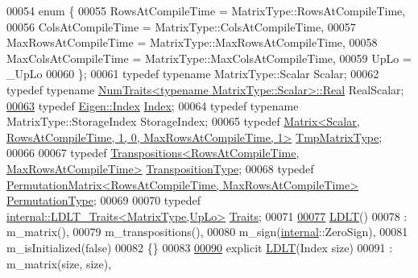 \begin{DoxyCode}
00054     \textcolor{keyword}{enum} \{
00055       RowsAtCompileTime = MatrixType::RowsAtCompileTime,
00056       ColsAtCompileTime = MatrixType::ColsAtCompileTime,
00057       MaxRowsAtCompileTime = MatrixType::MaxRowsAtCompileTime,
00058       MaxColsAtCompileTime = MatrixType::MaxColsAtCompileTime,
00059       UpLo = \_UpLo
00060     \};
00061     \textcolor{keyword}{typedef} \textcolor{keyword}{typename} MatrixType::Scalar Scalar;
00062     \textcolor{keyword}{typedef} \textcolor{keyword}{typename} \hyperlink{group___core___module_struct_eigen_1_1_num_traits}{NumTraits<typename MatrixType::Scalar>::Real}
       RealScalar;
\hyperlink{group___cholesky___module_ad9c57eb2fb3bbccd51b9d2e111bea355}{00063}     \textcolor{keyword}{typedef} \hyperlink{namespace_eigen_a62e77e0933482dafde8fe197d9a2cfde}{Eigen::Index} \hyperlink{group___cholesky___module_ad9c57eb2fb3bbccd51b9d2e111bea355}{Index}; 
00064     \textcolor{keyword}{typedef} \textcolor{keyword}{typename} MatrixType::StorageIndex StorageIndex;
00065     \textcolor{keyword}{typedef} \hyperlink{group___core___module}{Matrix<Scalar, RowsAtCompileTime, 1, 0, MaxRowsAtCompileTime, 1>}
       \hyperlink{group___core___module}{TmpMatrixType};
00066 
00067     \textcolor{keyword}{typedef} \hyperlink{group___core___module}{Transpositions<RowsAtCompileTime, MaxRowsAtCompileTime>}
       \hyperlink{group___core___module}{TranspositionType};
00068     \textcolor{keyword}{typedef} \hyperlink{group___core___module}{PermutationMatrix<RowsAtCompileTime, MaxRowsAtCompileTime>}
       \hyperlink{group___core___module}{PermutationType};
00069 
00070     \textcolor{keyword}{typedef} \hyperlink{struct_eigen_1_1internal_1_1_l_d_l_t___traits}{internal::LDLT\_Traits<MatrixType,UpLo>} 
      \hyperlink{struct_eigen_1_1internal_1_1_l_d_l_t___traits}{Traits};
00071 
\hyperlink{group___cholesky___module_a2e06dedd2651649c5b251fbf9ba4e7d4}{00077}     \hyperlink{group___cholesky___module_a2e06dedd2651649c5b251fbf9ba4e7d4}{LDLT}()
00078       : m\_matrix(),
00079         m\_transpositions(),
00080         m\_sign(\hyperlink{namespaceinternal}{internal}::ZeroSign),
00081         m\_isInitialized(false)
00082     \{\}
00083 
\hyperlink{group___cholesky___module_a154aa41bd2460199d48861eaf5e4f597}{00090}     \textcolor{keyword}{explicit} \hyperlink{group___cholesky___module_a154aa41bd2460199d48861eaf5e4f597}{LDLT}(Index size)
00091       : m\_matrix(size, size),

\end{DoxyCode}
